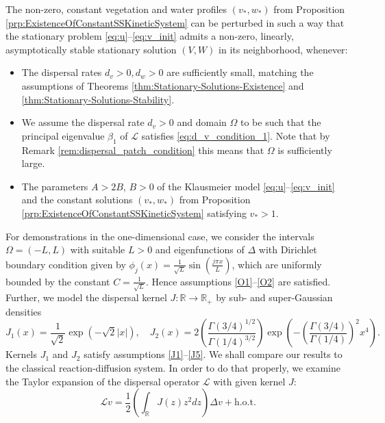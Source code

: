 \documentclass[preprint,12pt]{elsarticle}
\theoremstyle{plain}
\theoremstyle{definition}
\theoremstyle{remark}
\begin{document}
The non-zero, constant vegetation and water profiles $(v_*, w_*)$ from Proposition \ref{prp:ExistenceOfConstantSSKineticSystem} can be perturbed in such a way that the stationary problem \eqref{eq:u}--\eqref{eq:v_init} admits a non-zero, linearly, asymptotically stable stationary solution $(V, W)$ in its neighborhood, whenever: 
\begin{itemize}
    \item[(A1)] The dispersal rates $d_v > 0, d_w > 0$ are sufficiently small, matching the assumptions of Theorems \ref{thm:Stationary-Solutions-Existence} and \ref{thm:Stationary-Solutions-Stability}.
    \item[(A2)] We assume the dispersal rate $d_v > 0$ and domain $\Omega$ to be such that the principal eigenvalue $\beta_1$ of $\mathcal{L}$ satisfies \eqref{eq:d_v_condition_1}. Note that by Remark \ref{rem:dispersal_patch_condition} this means that $\Omega$ is sufficiently large.
    \item[(A3)] The parameters $A > 2B$, $B > 0$ of the Klausmeier model \eqref{eq:u}--\eqref{eq:v_init} and the constant solutions $(v_*, w_*)$ from Proposition \ref{prp:ExistenceOfConstantSSKineticSystem} satisfying $v_* > 1$.
\end{itemize}
For demonstrations in the one-dimensional case, we consider the intervals $\Omega = (-L, L)$ with suitable $L > 0$ and eigenfunctions of $\Delta$ with Dirichlet boundary condition given by $\phi_j(x) = \frac{1}{\sqrt{L}}\sin(\frac{j\pi x}{L})$, which are uniformly bounded by the constant $C = \frac{1}{\sqrt{L}}$. Hence assumptions \ref{O1}--\ref{O2} are satisfied. Further, we model the dispersal kernel $J: \mathbb{R} \rightarrow \mathbb{R}_+$ by sub- and super-Gaussian densities 
\begin{equation}
    \label{eq:1dGaussian_PDF}
    J_1(x) = \frac{1}{\sqrt{2}} \exp(-\sqrt{2}|x|), \quad
    J_2(x) = 2 \left(\frac{\Gamma(3/4)^{1/2}}{\Gamma(1/4)^{3/2}}\right) \exp\left(- \left( \frac{\Gamma(3/4)}{\Gamma(1/4)}\right)^2 x^4\right).
\end{equation}
Kernels $J_1$ and $J_2$ satisfy assumptions \ref{J1}--\ref{J5}. We shall compare our results to the classical reaction-diffusion system. In order to do that properly, we examine the Taylor expansion of the dispersal operator $\mathcal{L}$ with given kernel $J$:
\begin{equation}
    \label{eq:dispersal_op_taylor_expansion}
    \mathcal{L} v = \frac{1}{2}\left(\int_{\mathbb{R}} J(z)z^2dz\right) \Delta v + \text{h.o.t.}
\end{equation}
\end{document}
